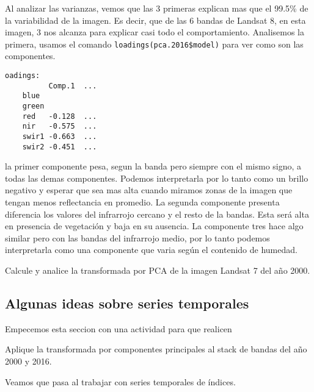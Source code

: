 \begin{exa}
    Al analizar las varianzas, vemos que las 3 primeras explican mas que el
    99.5\% de la variabilidad de la imagen. Es decir, que de las 6 bandas de
    Landsat 8, en esta imagen, 3 nos alcanza para explicar casi todo el
    comportamiento. Analisemos la primera, usamos el comando
    \texttt{loadings(pca.2016\$model)} para ver como son las componentes.

    \begin{Verbatim}[fontsize=\small]
    oadings:
          Comp.1  ...
    blue
    green
    red   -0.128  ...
    nir   -0.575  ...
    swir1 -0.663  ...
    swir2 -0.451  ...
    \end{Verbatim}

    la primer componente pesa, segun la banda pero siempre con el mismo signo, a
    todas las demas componentes. Podemos interpretarla por lo tanto como un
    brillo negativo y esperar que sea mas alta cuando miramos zonas de la imagen que
    tengan menos reflectancia en promedio. La segunda componente presenta diferencia
    los valores del infrarrojo cercano y el resto de la bandas. Esta ser\'a alta
    en presencia de vegetaci\'on y baja en su ausencia. La componente tres hace
    algo similar pero con las bandas del infrarrojo medio, por lo tanto podemos
    interpretarla como una componente que varia seg\'un el contenido de humedad.
\end{exa}

\begin{act}
    Calcule y analice la transformada por PCA de la imagen Landsat 7 del año
    2000.
\end{act}

\subsection{Algunas ideas sobre series temporales}

Empecemos esta seccion con una actividad para que realicen

\begin{act}
    Aplique la transformada por componentes principales al stack de bandas del
    año 2000 y 2016.
\end{act}

Veamos que pasa al trabajar con series temporales de \'indices.


